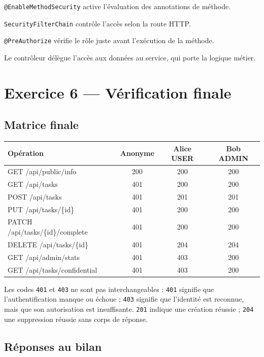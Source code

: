 \documentclass[11pt,a4paper]{article}
\begin{document}
\texttt{@EnableMethodSecurity} active l’évaluation des annotations de méthode.

\texttt{SecurityFilterChain} contrôle l’accès selon la route HTTP.

\texttt{@PreAuthorize} vérifie le rôle juste avant l’exécution de la méthode.

Le contrôleur délègue l’accès aux données au service, qui porte la logique métier.

\section{Exercice 6 — Vérification finale}

\subsection{Matrice finale}

\begin{center}
\begin{tabularx}{\linewidth}{>{\ttfamily}X c c c}
\toprule
Opération & Anonyme & Alice USER & Bob ADMIN \\
\midrule
GET /api/public/info & 200 & 200 & 200 \\
GET /api/tasks & 401 & 200 & 200 \\
POST /api/tasks & 401 & 201 & 201 \\
PUT /api/tasks/\{id\} & 401 & 200 & 200 \\
PATCH /api/tasks/\{id\}/complete & 401 & 200 & 200 \\
DELETE /api/tasks/\{id\} & 401 & 204 & 204 \\
GET /api/admin/stats & 401 & 403 & 200 \\
GET /api/tasks/confidential & 401 & 403 & 200 \\
\bottomrule
\end{tabularx}
\end{center}

Les codes \texttt{401} et \texttt{403} ne sont pas interchangeables : \texttt{401} signifie que l’authentification manque ou échoue ; \texttt{403} signifie que l’identité est reconnue, mais que son autorisation est insuffisante. \texttt{201} indique une création réussie ; \texttt{204} une suppression réussie sans corps de réponse.

\subsection{Réponses au bilan}
\end{document}
